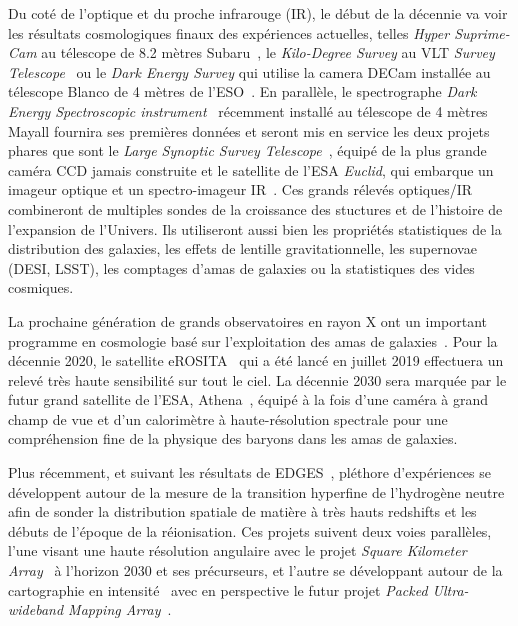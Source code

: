 Du coté de l'optique et du proche infrarouge (IR), le début de la
décennie va voir les résultats cosmologiques finaux des expériences
actuelles, telles \emph{Hyper Suprime-Cam} au télescope de 8.2 mètres
Subaru~\citep[HSC, ][]{SUBARU2018}, le \emph{Kilo-Degree Survey} au
VLT \emph{Survey Telescope}~\citep[KiDS, ][]{KiDS2013} ou le \emph{Dark Energy
Survey} qui utilise la camera DECam installée au télescope Blanco de 4 mètres
de l'ESO~\citep[DES, ][]{DES2016}. En parallèle, le
spectrographe \emph{Dark Energy Spectroscopic instrument}~\citep[DESI,
][]{DESI2016}
récemment installé au télescope de 4 mètres Mayall fournira ses
premières données et seront mis en
service les deux projets phares que sont le \emph{Large Synoptic
Survey Telescope}~\citep[LSST, ][]{LSST2009}, équipé de la plus grande caméra
CCD jamais construite %
et le satellite de l'ESA \emph{Euclid}, qui embarque
un imageur optique et un spectro-imageur IR~\citep{EUCLID2011}. Ces
grands rélevés optiques/IR combineront de multiples sondes de la
croissance des stuctures et de l'histoire de l'expansion de l'Univers.
Ils utiliseront aussi bien les propriétés statistiques de la distribution
des galaxies, les effets de lentille gravitationnelle, les supernovae
(DESI, LSST), les comptages d'amas de galaxies ou la statistiques des vides
cosmiques. 

La prochaine génération de grands observatoires en rayon X ont un
important programme en cosmologie basé sur l'exploitation des amas de
galaxies~\citep{eROSITA_cosmo}. Pour la décennie 2020, le satellite
eROSITA~\citep{eROSITA2014} qui a été lancé en juillet 2019 effectuera
un relevé très haute sensibilité sur tout le ciel. La décennie 2030
sera marquée par le futur grand satellite de l'ESA,
Athena~\citep{ATHENA2013},
équipé à la fois d'une caméra à grand champ de vue et d'un calorimètre
à haute-résolution spectrale pour une compréhension fine de la
physique des baryons dans les amas de galaxies. 

Plus récemment, et suivant les résultats de
EDGES~\citep{EDGES2018Natur}, pléthore d'expériences se développent
autour de la mesure de la transition hyperfine de l'hydrogène neutre
afin de sonder la distribution spatiale de matière à très hauts
redshifts et les débuts
de l'époque de la réionisation. Ces projets suivent deux voies
parallèles, l'une visant une haute résolution angulaire avec le projet
\emph{Square Kilometer Array}~\citep[SKA][]{SKA2018} à l'horizon 2030 et ses
précurseurs, et l'autre se développant autour de la cartographie en
intensité~\citep[par exemple][]{TIANLAI2018, HIRAX2016} avec en perspective le
futur projet \emph{Packed Ultra-wideband Mapping
Array}~\citep[PUMA,][]{PUMA2019}.\\

